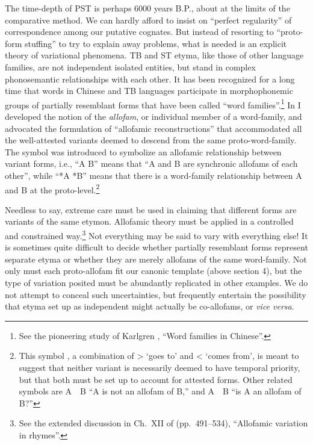 The time-depth of PST is perhaps 6000 years B.P., about at the limits of the
comparative method. We can hardly afford to insist on “perfect regularity” of
correspondence among our putative cognates. But instead of resorting to
“proto-form stuffing” to try to explain away problems, what is needed is an
explicit theory of variational phenomena. TB and ST etyma, like those of other
language families, are not independent isolated entities, but stand in complex
phonosemantic relationships with each other. It has been recognized for a long
time that words in Chinese and TB languages participate in morphophonemic groups
of partially resemblant forms that have been called “word families”.\footnote{See
the pioneering study of Karlgren \citeyearpar{BK-WFC}, “Word families in Chinese”.}  In
\textit{} I developed the notion of the \textit{allofam},
or individual member of a word-family, and advocated the formulation of “allofamic reconstructions”
that accommodated all the well-attested variants deemed to descend from the same
proto-word-family. The symbol  was introduced to symbolize an allofamic
relationship between variant forms, i.e., “A  B” means that “A and B are
synchronic allofams of each other”, while “*A  *B” means that there is a
word-family relationship between A and B at the proto-level.\footnote{This
symbol , a combination of  >  ‘goes to’ and < ‘comes from’, is meant to suggest
that neither variant is necessarily deemed to have temporal priority, but that
both must be set up to account for attested forms. Other related symbols are A~~B “A is not an allofam of B,” and A~~B “is A an allofam of B?”}


Needless to say, extreme care must be used in claiming that different forms
are variants of the same etymon. Allofamic theory must be applied in a
controlled and constrained way.\footnote{See the extended discussion in Ch.~XII
of \textit{} (pp.~491–534), “Allofamic variation in  rhymes”.} Not everything may be
said to vary with everything else! It is sometimes quite difficult to decide
whether partially resemblant forms represent separate etyma or whether they are
merely allofams of the same word-family. Not only must each proto-allofam fit
our canonic template (above section 4), but the type of variation posited must be
abundantly replicated in other examples. We do not attempt to
conceal such uncertainties, but frequently entertain the possibility that etyma
set up as independent might actually be co-allofams, or \textit{vice versa}.

